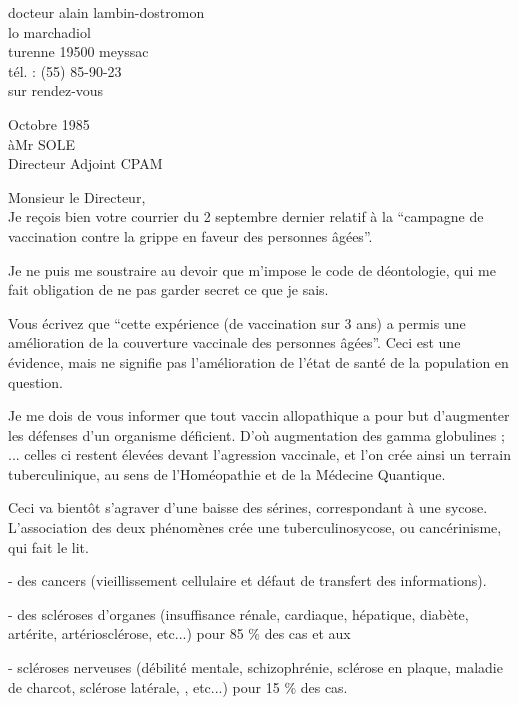 docteur alain lambin-dostromon\\
lo marchadiol\\
turenne 19500 meyssac\\
tél. : (55) 85-90-23\\
sur rendez-vous\\


Octobre 1985\\
à\qquad Mr SOLE\\
Directeur Adjoint CPAM\\


Monsieur le Directeur,\\

Je reçois bien votre courrier du 2 septembre dernier relatif à la ``campagne de vaccination contre la grippe en faveur des personnes âgées''.

Je ne puis me soustraire au devoir que m'impose le code de déontologie, qui me fait obligation de ne pas garder secret ce que je sais.

Vous écrivez que ``cette expérience (de vaccination sur 3 ans) a permis une amélioration de la couverture vaccinale des personnes âgées''. Ceci est une évidence, mais ne signifie pas l'amélioration de l'état de santé de la population en question.

Je me dois de vous informer que tout vaccin allopathique a pour but d'augmenter les défenses d'un organisme déficient. D'où augmentation des gamma globulines ; ... celles ci restent élevées devant l'agression vaccinale, et l'on crée ainsi un terrain tuberculinique, au sens de l'Homéopathie et de la Médecine Quantique.

Ceci va bientôt s'agraver d'une baisse des sérines, correspondant à une sycose. L'association des deux phénomènes crée une tuberculinosycose, ou cancérinisme, qui fait le lit.

- des cancers (vieillissement cellulaire et défaut de transfert des informations).

- des scléroses d'organes (insuffisance rénale, cardiaque, hépatique, diabète, artérite, artériosclérose, etc...) pour 85 \% des cas et aux

- scléroses nerveuses (débilité mentale, schizophrénie, sclérose en plaque, maladie de charcot, sclérose latérale, , etc...) pour 15 \% des cas.

